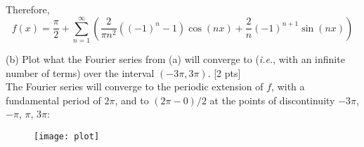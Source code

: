 \documentclass[11pt]{article}
\newcommand{\ie}{{\em i.e.}, }
\begin{document}
Therefore,
\begin{equation*}
f(x) = \frac{\pi}{2} + \sum_{n=1}^{\infty} \left( \frac{2}{\pi n^2} ((-1)^n - 1) \cos( nx) + \frac{2}{n} (-1)^{n+1} \sin( nx) \right)
\end{equation*}

(b) Plot what the Fourier series from (a) will converge to (\ie with an infinite number of terms) over the interval $(-3\pi, 3\pi)$. [2 pts] \\

The Fourier series will converge to the periodic extension of $f$, with a fundamental period of $2\pi$, and to $(2\pi - 0) / 2$ at the points of discontinuity $-3\pi$, $-\pi$, $\pi$, $3\pi$:

\begin{figure}[h]
\centering
\texttt{[image: plot]}
\label{fig:plot}
\end{figure}
\end{document}
